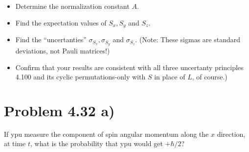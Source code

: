 \documentclass[../main.tex]{subfiles}
\begin{document}
\begin{itemize}
    \item Determine the normalization constant $A$.
    \item Find the expectation values of $S_x, S_y$ and $S_z$.
    \item Find the ``uncertanties'' $\sigma_{S_x},\sigma_{S_y}$ and $\sigma_{S_z}$. (Note: These sigmas are standard deviations, not Pauli matrices!)
    \item Confirm that your results are consistent with all three uncertanty principles 4.100 and its cyclic permutations-only with $S$ in place of $L$, of course.)
\end{itemize}

\section{Problem 4.32 a)}

If ypu measure the component of spin angular momentum along the $x$ direction, at time $t$, what is the probability that ypu would get $+\hbar/2$?
\end{document}
